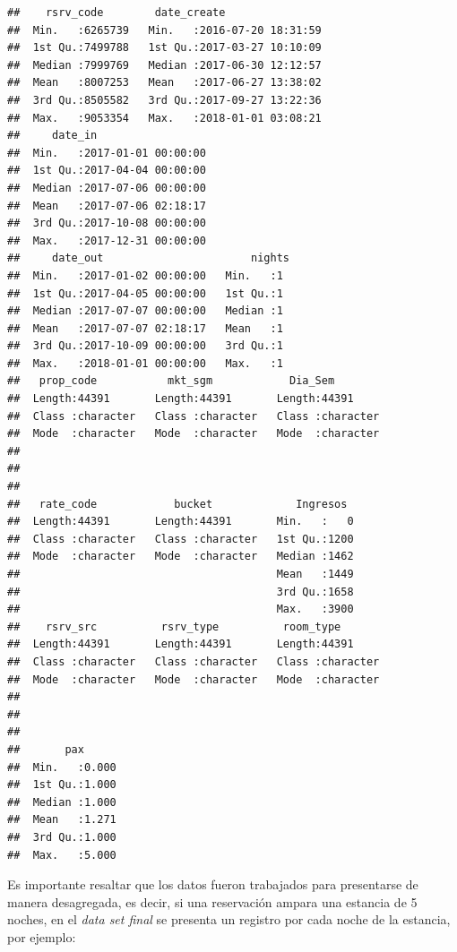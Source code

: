 \begin{verbatim}
##    rsrv_code        date_create                 
##  Min.   :6265739   Min.   :2016-07-20 18:31:59  
##  1st Qu.:7499788   1st Qu.:2017-03-27 10:10:09  
##  Median :7999769   Median :2017-06-30 12:12:57  
##  Mean   :8007253   Mean   :2017-06-27 13:38:02  
##  3rd Qu.:8505582   3rd Qu.:2017-09-27 13:22:36  
##  Max.   :9053354   Max.   :2018-01-01 03:08:21  
##     date_in                   
##  Min.   :2017-01-01 00:00:00  
##  1st Qu.:2017-04-04 00:00:00  
##  Median :2017-07-06 00:00:00  
##  Mean   :2017-07-06 02:18:17  
##  3rd Qu.:2017-10-08 00:00:00  
##  Max.   :2017-12-31 00:00:00  
##     date_out                       nights 
##  Min.   :2017-01-02 00:00:00   Min.   :1  
##  1st Qu.:2017-04-05 00:00:00   1st Qu.:1  
##  Median :2017-07-07 00:00:00   Median :1  
##  Mean   :2017-07-07 02:18:17   Mean   :1  
##  3rd Qu.:2017-10-09 00:00:00   3rd Qu.:1  
##  Max.   :2018-01-01 00:00:00   Max.   :1  
##   prop_code           mkt_sgm            Dia_Sem         
##  Length:44391       Length:44391       Length:44391      
##  Class :character   Class :character   Class :character  
##  Mode  :character   Mode  :character   Mode  :character  
##                                                          
##                                                          
##                                                          
##   rate_code            bucket             Ingresos   
##  Length:44391       Length:44391       Min.   :   0  
##  Class :character   Class :character   1st Qu.:1200  
##  Mode  :character   Mode  :character   Median :1462  
##                                        Mean   :1449  
##                                        3rd Qu.:1658  
##                                        Max.   :3900  
##    rsrv_src          rsrv_type          room_type        
##  Length:44391       Length:44391       Length:44391      
##  Class :character   Class :character   Class :character  
##  Mode  :character   Mode  :character   Mode  :character  
##                                                          
##                                                          
##                                                          
##       pax       
##  Min.   :0.000  
##  1st Qu.:1.000  
##  Median :1.000  
##  Mean   :1.271  
##  3rd Qu.:1.000  
##  Max.   :5.000
\end{verbatim}

Es importante resaltar que los datos fueron trabajados para presentarse de manera desagregada, es decir, si una reservación ampara una estancia de 5 noches, en el \emph{data set final} se presenta un registro por cada noche de la estancia, por ejemplo:

